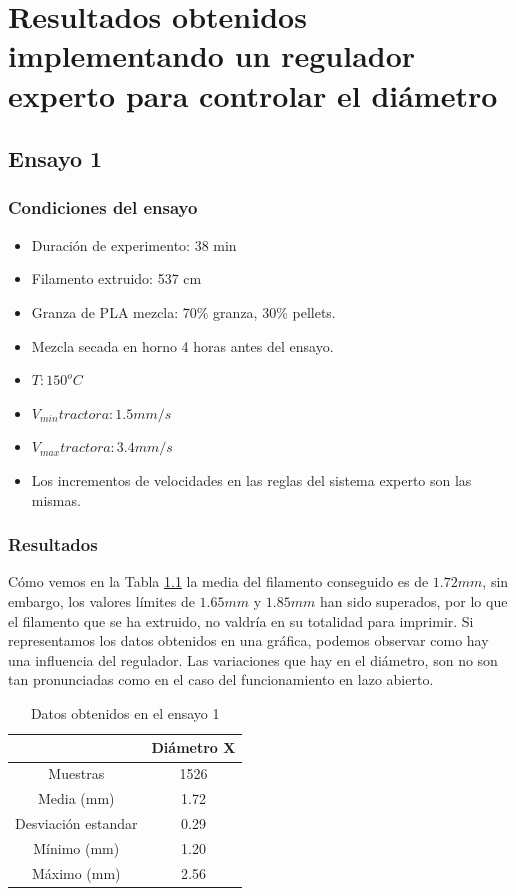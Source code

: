 \chapter[Resultados obtenidos implementando un regulador experto.]{Resultados obtenidos implementando un regulador experto para controlar el diámetro}
\label{ane:resultados_regu}
\section{Ensayo 1}

\subsection{Condiciones del ensayo}

\begin{itemize}
	\item{Duración de experimento: 38 min}
	\item{Filamento extruido: 537 cm}
	\item{Granza de PLA mezcla: 70\% granza, 30\% pellets.}
	\item{Mezcla secada en horno 4 horas antes del ensayo.}
	\item{$T: 150^oC$}
	\item{$V_{min} tractora: 1.5 mm/s$}
	\item{$V_{max} tractora: 3.4 mm/s$}
	\item{Los incrementos de velocidades en las reglas del sistema experto son las mismas.}
\end{itemize}

\subsection{Resultados}
Cómo vemos en la Tabla \ref{tab:resl_ens1} la media del filamento conseguido es de $1.72 mm$, sin embargo, los valores límites de $1.65 mm$ y $1.85 mm$ han sido superados, por lo que el filamento que se ha extruido, no valdría en su totalidad para imprimir. Si representamos los datos obtenidos en una gráfica, podemos observar como hay una influencia del regulador. Las variaciones que hay en el diámetro, son no son tan pronunciadas como en el caso del funcionamiento en lazo abierto.

\begin{table}[H]
	\centering
	\begin{tabular}{cc}
		                    & Diámetro X \\ \hline
		Muestras            & 1526       \\
		Media (mm)          & 1.72       \\
		Desviación estandar & 0.29       \\
		Mínimo (mm)         & 1.20       \\
		Máximo (mm)         & 2.56      
	\end{tabular}
	\caption{Datos obtenidos en el ensayo 1}
	\label{tab:resl_ens1}
\end{table}


